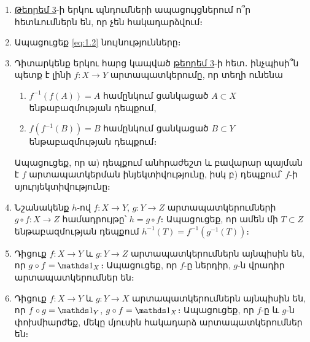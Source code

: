 \begin{enumerate}[label=\thesection.\arabic*.]
\item  \hyperref[ch1thm3]{Թեորեմ 3}-ի երկու պնդումների ապացույցներում ո՞ր հետևումներն են, որ չեն հակադարձվում։

\item  Ապացուցեք \eqref{eq:1.2} նույնությունները։

\item  Դիտարկենք երկու հարց կապված \hyperref[ch1thm3]{թեորեմ 3}-ի հետ․ ինչպիսի՞ն պետք է լինի $f:X \rightarrow Y$ արտապատկերումը, որ տեղի ունենա
\begin{enumerate}
    \item[ա)] $f^{-1}(f(A))=A$ համընկում ցանկացած $A \subset X$ ենթաբազմության դեպքում,
    
    \item[բ)] $f(f^{-1}(B))=B$ համընկում ցանկացած $B \subset Y$ ենթաբազմության դեպքում։
\end{enumerate}

Ապացուցեք, որ ա) դեպքում անհրաժեշտ և բավարար պայման է $f$ արտա\-պատ\-կեր\-ման ինյեկտիվությունը, իսկ բ) դեպքում՝ $f$-ի սյուրյեկտիվությունը։

\item  Նշանակենք $h$-ով $f:X \rightarrow Y$, $g:Y \rightarrow Z$ արտապատկերումների $g \circ f: X \rightarrow Z$ համադրույթը՝ $h=g \circ f$։ Ապացուցեք, որ ամեն մի $T \subset Z$ ենթաբազմության դեպքում $h^{-1}(T)=f^{-1}(g^{-1}(T))$։

\item  Դիցուք $f:X \rightarrow Y$ և $g:Y \rightarrow Z$ արտապատկերումներն այնպիսին են, որ $g\circ f = \nuynakan_X$։ Ապացուցեք, որ $f$-ը ներդիր, $g$-ն վրադիր արտապատկերումներ են։

\item  Դիցուք $f:X \rightarrow Y$ և $g:Y \rightarrow X$ արտապատկերումներն այնպիսին են, որ $f\circ g = \nuynakan_Y$, $g\circ f = \nuynakan_X$։ Ապացուցեք, որ $f$-ը և $g$-ն փոխմիարժեք, մեկը մյուսին հակադարձ արտապատկերումներ են։
\end{enumerate}
